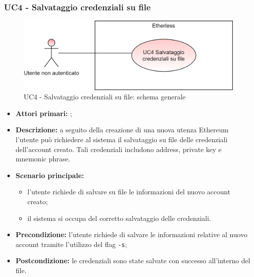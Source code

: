 \subsubsection{UC4 - Salvataggio credenziali su file}
\begin{figure}[h]
	\centering
	\includegraphics[scale=\ucs]{./res/img/UC4G.png}
	\caption {UC4 - Salvataggio credenziali su file: schema generale}
\end{figure}
\begin{itemize}
	\item \textbf{Attori primari:} \una{};
	\item \textbf{Descrizione:} a seguito della creazione di una nuova utenza Ethereum l’utente può richiedere al sistema il salvataggio su file delle credenziali dell’account creato. Tali credenziali includono address, private key e mnemonic phrase.
	\item \textbf{Scenario principale:}
	\begin{itemize}
		\item l’utente richiede di salvare su file le informazioni del nuovo account creato; 
		\item il sistema si occupa del corretto salvataggio delle credenziali. 
	\end{itemize}
	\item \textbf{Precondizione:} l’utente richiede di salvare le informazioni relative al nuovo account tramite l’utilizzo del flag \texttt{-s};  
	\item \textbf{Postcondizione:} le credenziali sono state salvate con successo all’interno del file.  
\end{itemize}